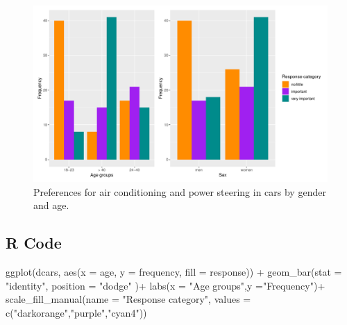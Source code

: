 \documentclass[
  letterpaper,
  DIV=11,
  numbers=noendperiod]{scrartcl}
\newenvironment{Shaded}{\begin{snugshade}}{\end{snugshade}}
\newcommand{\AttributeTok}[1]{\textcolor[rgb]{0.40,0.45,0.13}{#1}}
\newcommand{\FunctionTok}[1]{\textcolor[rgb]{0.28,0.35,0.67}{#1}}
\newcommand{\NormalTok}[1]{\textcolor[rgb]{0.00,0.23,0.31}{#1}}
\newcommand{\SpecialCharTok}[1]{\textcolor[rgb]{0.37,0.37,0.37}{#1}}
\newcommand{\StringTok}[1]{\textcolor[rgb]{0.13,0.47,0.30}{#1}}
\begin{document}
\begin{figure}[H]

{\centering \includegraphics{index_files/figure-pdf/unnamed-chunk-24-1.pdf}

}

\caption{Preferences for air conditioning and power steering in cars by
gender and age.}

\end{figure}%

\subsection{R Code}

\begin{Shaded}
\begin{Highlighting}[]
 \FunctionTok{ggplot}\NormalTok{(dcars, }\FunctionTok{aes}\NormalTok{(}\AttributeTok{x =}\NormalTok{ age,}
                   \AttributeTok{y =}\NormalTok{ frequency, }
                   \AttributeTok{fill =}\NormalTok{ response)) }\SpecialCharTok{+}
      \FunctionTok{geom\_bar}\NormalTok{(}\AttributeTok{stat =} \StringTok{"identity"}\NormalTok{,}
               \AttributeTok{position =} \StringTok{"dodge"}\NormalTok{ )}\SpecialCharTok{+}
   \FunctionTok{labs}\NormalTok{(}\AttributeTok{x =} \StringTok{"Age groups"}\NormalTok{,}\AttributeTok{y =}\StringTok{"Frequency"}\NormalTok{)}\SpecialCharTok{+}
   \FunctionTok{scale\_fill\_manual}\NormalTok{(}\AttributeTok{name =} \StringTok{"Response category"}\NormalTok{,}
                     \AttributeTok{values =} \FunctionTok{c}\NormalTok{(}\StringTok{"darkorange"}\NormalTok{,}\StringTok{"purple"}\NormalTok{,}\StringTok{"cyan4"}\NormalTok{)) }
\end{Highlighting}
\end{Shaded}
\end{document}
